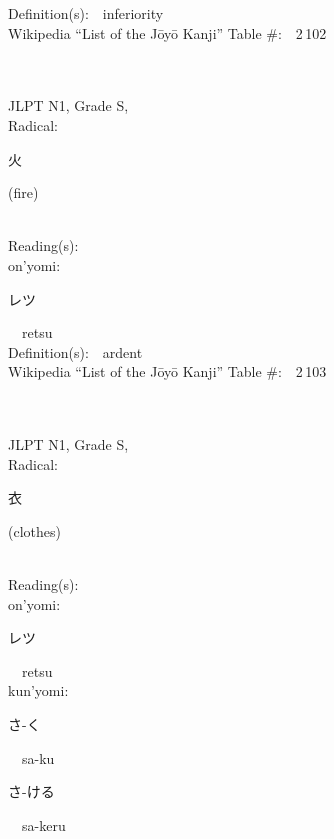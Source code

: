 \begin{multicols}{2}
Definition(s):\ \ inferiority \\
Wikipedia ``List of the J\=oy\=o Kanji'' Table \#:\ \ 2\,102 \\
\ \ \\
{\fontsize{34pt}{40pt}  }\ \ \\
{JLPT N1, Grade S, \\Radical:\ \ {\begin{CJK}{UTF8}{min} 火 \end{CJK}} (fire) } \\
Reading(s):\ \ \\
{\hspace*{1em}}on'yomi:\ \ \\
{\hspace*{2em}}{\begin{CJK}{UTF8}{min} レツ \end{CJK}}\ \ retsu\ \ \\
Definition(s):\ \ ardent \\
Wikipedia ``List of the J\=oy\=o Kanji'' Table \#:\ \ 2\,103 \\
\ \ \\
{\fontsize{34pt}{40pt}  }\ \ \\
{JLPT N1, Grade S, \\Radical:\ \ {\begin{CJK}{UTF8}{min} 衣 \end{CJK}} (clothes) } \\
Reading(s):\ \ \\
{\hspace*{1em}}on'yomi:\ \ \\
{\hspace*{2em}}{\begin{CJK}{UTF8}{min} レツ \end{CJK}}\ \ retsu\ \ \\
{\hspace*{1em}}kun'yomi:\ \ \\
{\hspace*{2em}}{\begin{CJK}{UTF8}{min} さ-く \end{CJK}}\ \ sa-ku\ \ \\
{\hspace*{2em}}{\begin{CJK}{UTF8}{min} さ-ける \end{CJK}}\ \ sa-keru\ \ \\

\end{multicols}
